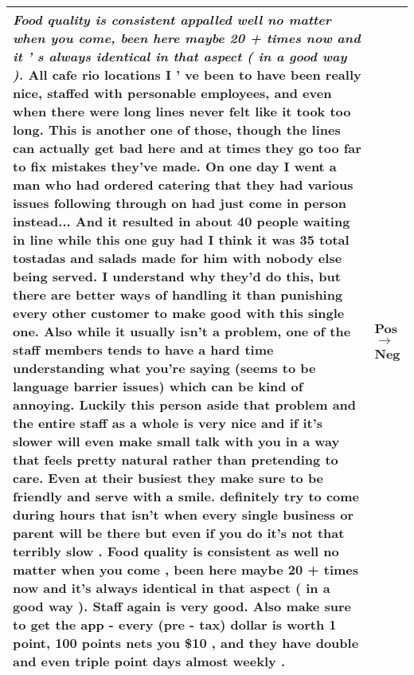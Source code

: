 \begin{table*}[htpb!]
\begin{tabular}{p{10.5cm}p{2.3cm}}
\textit{Food quality is consistent appalled well no matter when you come, been here maybe 20 + times now and it ' s always identical in that aspect ( in a good way ).} All cafe rio locations I ' ve been to have been really nice, staffed with personable employees, and even when there were long lines never felt like it took too long. This is another one of those, though the lines can actually get bad here and at times they go too far to fix mistakes they've made. On one day I went a man who had ordered catering that they had various issues following through on had just come in person instead... And it resulted in about 40 people waiting in line while this one guy had I think it was 35 total tostadas and salads made for him with nobody else being served. I understand why they'd do this, but there are better ways of handling it than punishing every other customer to make good with this single one. Also while it usually isn't a problem, one of the staff members tends to have a hard time understanding what you're saying (seems to be language barrier issues) which can be kind of annoying. Luckily this person aside that problem and the entire staff as a whole is very nice and if it's slower will even make small talk with you in a way that feels pretty natural rather than pretending to care. Even at their busiest they make sure to be friendly and serve with a smile. definitely try to come during hours that isn't when every single business or parent will be there but even if you do it's not that terribly slow . Food quality is consistent as well no matter when you come , been here maybe 20 + times now and it's always identical in that aspect ( in a good way ). Staff again is very good. Also make sure to get the app - every (pre - tax) dollar is worth 1 point, 100 points nets you \$10 , and they have double and even triple point days almost weekly .
&  Pos  $\rightarrow$ Neg  \\
\bottomrule
\end{tabular}
\end{table*}

